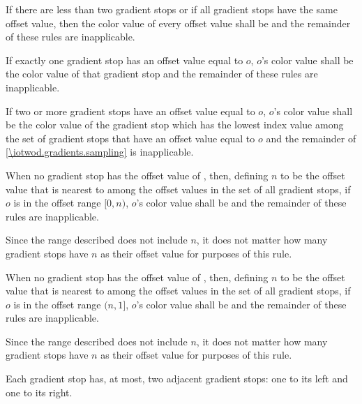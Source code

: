 \begin{enumeratea}
\item If there are less than two gradient stops or if all gradient stops have the same offset value, then the color value of every offset value shall be  and the remainder of these rules are inapplicable.

\item If exactly one gradient stop has an offset value equal to $o$, $o$'s color value shall be the color value of that gradient stop and the remainder of these rules are inapplicable.

\item If two or more gradient stops have an offset value equal to $o$, $o$'s color value shall be the color value of the gradient stop which has the lowest index value among the set of gradient stops that have an offset value equal to $o$ and the remainder of \ref{\iotwod.gradients.sampling} is inapplicable.

\item When no gradient stop has the offset value of , then, defining $n$ to be the offset value that is nearest to  among the offset values in the set of all gradient stops, if $o$ is in the offset range $[0, n)$, $o$'s color value shall be  and the remainder of these rules are inapplicable.
\begin{note}
Since the range described does not include $n$, it does not matter how many gradient stops have $n$ as their offset value for purposes of this rule.
\end{note}

\item When no gradient stop has the offset value of , then, defining $n$ to be the offset value that is nearest to  among the offset values in the set of all gradient stops, if $o$ is in the offset range $(n, 1]$, $o$'s color value shall be  and the remainder of these rules are inapplicable.
\begin{note}
Since the range described does not include $n$, it does not matter how many gradient stops have $n$ as their offset value for purposes of this rule.
\end{note}

\item Each gradient stop has, at most, two adjacent gradient stops: one to its left and one to its right.


\end{enumeratea}
